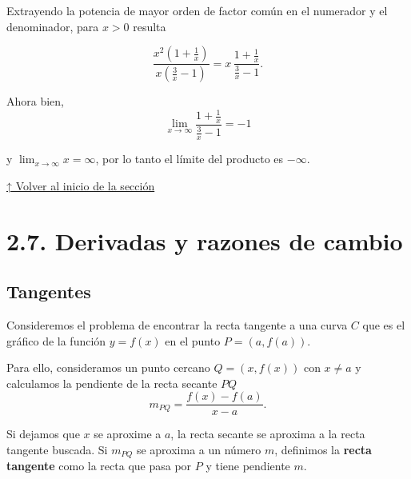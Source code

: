 \documentclass[
  letterpaper,
]{book}
\theoremstyle{plain}
\theoremstyle{remark}
\begin{document}
\begin{tcolorbox}[enhanced jigsaw, opacityback=0, left=2mm, opacitybacktitle=0.6, toprule=.15mm, bottomrule=.15mm, colbacktitle=quarto-callout-tip-color!10!white, titlerule=0mm, bottomtitle=1mm, title=\textcolor{quarto-callout-tip-color}{\faLightbulb}\hspace{0.5em}{Solución}, toptitle=1mm, colframe=quarto-callout-tip-color-frame, colback=white, breakable, rightrule=.15mm, arc=.35mm, leftrule=.75mm, coltitle=black]

Extrayendo la potencia de mayor orden de factor común en el numerador y
el denominador, para \(x>0\) resulta

\[
\frac{x^2\left(1+\frac{1}{x}\right)}{x\left(\frac{3}{x}-1\right)}=x\,\frac{1+\frac{1}{x}}{\frac{3}{x}-1}.
\]

Ahora bien, \[
\lim_{x\to \infty} \frac{1+\frac{1}{x}}{\frac{3}{x}-1}=-1
\]

y \(\lim_{x\to \infty} x=\infty\), por lo tanto el límite del producto
es \(-\infty\).

\end{tcolorbox}

\hyperref[seccion_2.6]{↑ Volver al inicio de la sección}

\section{2.7. Derivadas y razones de cambio}\label{seccion_2.7}

\subsection{Tangentes}\label{tangentes}

Consideremos el problema de encontrar la recta tangente a una curva
\(C\) que es el gráfico de la función \(y=f(x)\) en el punto
\(P=(a,f(a))\).

Para ello, consideramos un punto cercano \(Q=(x,f(x))\) con \(x\neq a\)
y calculamos la pendiente de la recta secante \(PQ\) \[
m_{PQ}=\frac{f(x)-f(a)}{x-a}.
\]

Si dejamos que \(x\) se aproxime a \(a\), la recta secante se aproxima a
la recta tangente buscada. Si \(m_{PQ}\) se aproxima a un número \(m\),
definimos la \textbf{recta tangente} como la recta que pasa por \(P\) y
tiene pendiente \(m\).
\end{document}
